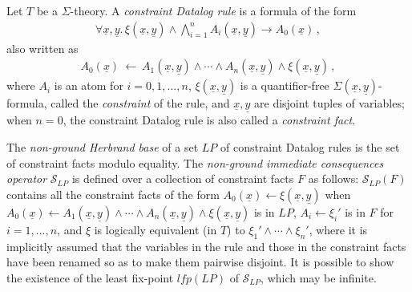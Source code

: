 \documentclass[conference]{llncs}
\begin{document}
{Let $T$ be a $\Sigma$-theory.  A \emph{constraint Datalog rule} is a
formula of the form
\begin{eqnarray*}
  \forall \underline{x},\underline{y}.\,
  \xi(\underline{x},\underline{y}) \wedge
  \bigwedge_{i=1}^n A_i(\underline{x},\underline{y}) 
  \rightarrow A_0(\underline{x})\,,
\end{eqnarray*}
also written as
\begin{eqnarray*}
  A_0(\underline{x})
  \ \leftarrow \
  A_1(\underline{x},\underline{y}) \wedge \cdots \wedge 
  A_n(\underline{x},\underline{y}) \wedge
  \xi(\underline{x},\underline{y})\,,
\end{eqnarray*}
where $A_i$ is an atom for $i=0,1,...,n$,
$\xi(\underline{x},\underline{y})$ is a quantifier-free
$\Sigma(\underline{x},\underline{y})$-formula, called the
\emph{constraint} of the rule, and $\underline{x},\underline{y}$ are
disjoint tuples of variables; when $n=0$, the constraint Datalog rule is
also called a \emph{constraint fact}.

The \emph{non-ground Herbrand base} of a set $\mathit{LP}$ of constraint
Datalog rules is the set of constraint facts modulo equality. The
\emph{non-ground immediate consequences operator}
$\mathcal{S}_{\mathit{LP}}$ is defined over a collection of constraint
facts $F$ as follows: $\mathcal{S}_{\mathit{LP}}(F)$ contains all the
constraint facts of the form $A_0(\underline{x}) \leftarrow
\xi(\underline{x},\underline{y})$ when $A_0(\underline{x}) \leftarrow
A_1(\underline{x},\underline{y}) \wedge \cdots \wedge
A_n(\underline{x},\underline{y}) \wedge
\xi(\underline{x},\underline{y})$ is in $\mathit{LP}$, $A_i\leftarrow
\xi_i'$ is in $F$ for $i=1, ..., n$, and $\xi$ is logically equivalent
(in $T$) to $\xi_1'\wedge \cdots \wedge \xi_n'$, where it is implicitly
assumed that the variables in the rule and those in the constraint facts
have been renamed so as to make them pairwise disjoint. It is possible
to show the existence of the least fix-point
$\mathit{lfp}({\mathit{LP}})$ of $\mathcal{S}_{\mathit{LP}}$, which may
be infinite.

}
\end{document}
